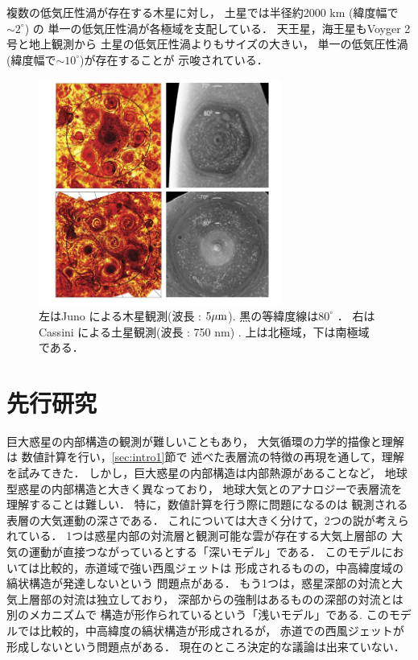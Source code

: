 \documentclass[a4j,12pt,openbib,oneside]{jreport}
\begin{document}
複数の低気圧性渦が存在する木星に対し，
土星では半径約2000 km (緯度幅で$\sim 2^\circ$) の
単一の低気圧性渦が各極域を支配している．
%
天王星，海王星もVoyger 2号と地上観測から
土星の低気圧性渦よりもサイズの大きい，
単一の低気圧性渦(緯度幅で$\sim 10^\circ$)が存在することが
示唆されている．
%
\begin{figure}[t]
  \begin{center}
    \includegraphics[clip,width=8cm]{./fig/intro/fig2.png}
    \caption{
      \footnotesize{左はJuno による木星観測(波長 : $5 \rm{\mu m}$).
黒の等緯度線は$80^\circ$ \citep{Adriani2018}．
右はCassini による土星観測(波長 : 750 nm) \citep{Antuano2015}.
上は北極域，下は南極域である．
      }
    }
    \label{fig2}
  \end{center}
\end{figure}
%
%
\def\intro2{先行研究}
\section{\intro2}
\label{sec:intro2}
巨大惑星の内部構造の観測が難しいこともあり，
大気循環の力学的描像と理解は
数値計算を行い，\ref{sec:intro1}節で
述べた表層流の特徴の再現を通して，理解を試みてきた．
%
しかし，巨大惑星の内部構造は内部熱源があることなど，
地球型惑星の内部構造と大きく異なっており，
地球大気とのアナロジーで表層流を理解することは難しい．
特に，数値計算を行う際に問題になるのは
観測される表層の大気運動の深さである．
これについては大きく分けて，2つの説が考えられている．
%
1つは惑星内部の対流層と観測可能な雲が存在する大気上層部の
大気の運動が直接つながっているとする「深いモデル」である．
このモデルにおいては比較的，赤道域で強い西風ジェットは
形成されるものの，中高緯度域の縞状構造が発達しないという
問題点がある\citep{CHRISTENSEN2002}．
%
もう1つは，惑星深部の対流と大気上層部の対流は独立しており，
深部からの強制はあるものの深部の対流とは別のメカニズムで
構造が形作られているという「浅いモデル」である.
このモデルでは比較的，中高緯度の縞状構造が形成されるが，
赤道での西風ジェットが形成しないという問題点がある\citep{Scott2007}．
%
現在のところ決定的な議論は出来ていない．
%
\end{document}

